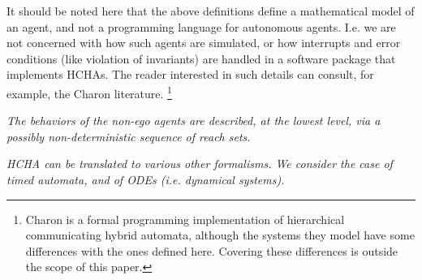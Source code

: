 It should be noted here that the above definitions define a mathematical model of an agent, and not a programming language for autonomous agents. 
I.e. we are not concerned with how such agents are simulated, or how interrupts and error conditions (like violation of invariants) are handled in a software package that implements HCHAs.
The reader interested in such details can consult, for example, the Charon literature.
\footnote{Charon is a formal programming implementation of hierarchical communicating hybrid automata, although the systems they model have some differences with the ones defined here. Covering these differences is outside the scope of this paper.}

{\it The behaviors of the non-ego agents are described, at the lowest level, via a possibly non-deterministic sequence of reach sets.}

{\it HCHA can be translated to various other formalisms. We consider the case of timed automata, and of ODEs (i.e. dynamical systems).}

